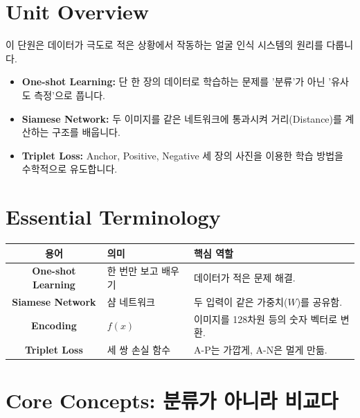 \documentclass[11pt,a4paper]{book}
\theoremstyle{definition}
\begin{document}
\section{Unit Overview}
\begin{summarybox}[title={핵심 목표}]
이 단원은 데이터가 극도로 적은 상황에서 작동하는 얼굴 인식 시스템의 원리를 다룹니다.
\begin{itemize}
    \item \textbf{One-shot Learning:} 단 한 장의 데이터로 학습하는 문제를 '분류'가 아닌 '유사도 측정'으로 풉니다.
    \item \textbf{Siamese Network:} 두 이미지를 같은 네트워크에 통과시켜 거리(Distance)를 계산하는 구조를 배웁니다.
    \item \textbf{Triplet Loss:} Anchor, Positive, Negative 세 장의 사진을 이용한 학습 방법을 수학적으로 유도합니다.
\end{itemize}
\end{summarybox}

\section{Essential Terminology}
\begin{center}
\begin{tabular}{|c|l|l|}
\hline
\textbf{용어} & \textbf{의미} & \textbf{핵심 역할} \\ \hline
\textbf{One-shot Learning} & 한 번만 보고 배우기 & 데이터가 적은 문제 해결. \\ \hline
\textbf{Siamese Network} & 샴 네트워크 & 두 입력이 같은 가중치($W$)를 공유함. \\ \hline
\textbf{Encoding} & $f(x)$ & 이미지를 128차원 등의 숫자 벡터로 변환. \\ \hline
\textbf{Triplet Loss} & 세 쌍 손실 함수 & A-P는 가깝게, A-N은 멀게 만듦. \\ \hline
\end{tabular}
\end{center}

\section{Core Concepts: 분류가 아니라 비교다}
\end{document}
